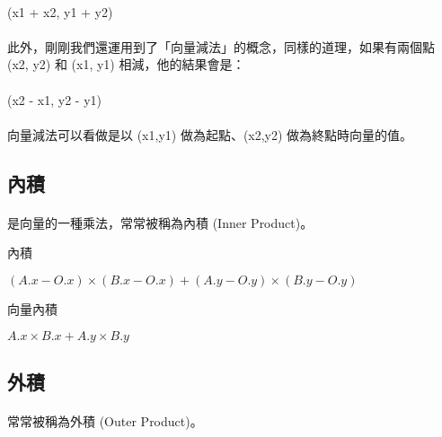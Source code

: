 \documentclass[12pt,a4paper,oneside]{report}
\begin{document}
\begin{CJK}{UTF8}{bkai}
\paragraph{}(x1 + x2, y1 + y2)
\paragraph{}此外，剛剛我們還運用到了「向量減法」的概念，同樣的道理，如果有兩個點 (x2, y2) 和 (x1, y1) 相減，他的結果會是：
\paragraph{}(x2 - x1, y2 - y1)
\paragraph{}向量減法可以看做是以 (x1,y1) 做為起點、(x2,y2) 做為終點時向量的值。

\subsection{內積}

\paragraph{}是向量的一種乘法，常常被稱為內積 (Inner Product)。
\begin{algorithm}
\caption{內積}
\label{algo:dot_product}
\begin{algorithmic}
  \State \Return $(A.x-O.x)\times{(B.x-O.x)}+(A.y-O.y)\times{(B.y-O.y)}$
\EndProcedure
\end{algorithmic}
\end{algorithm}

\begin{algorithm}
\caption{向量內積}
\label{algo:dot_product_vector}
\begin{algorithmic}
  \State \Return $A.x\times{B.x}+A.y\times{B.y}$
\EndProcedure
\end{algorithmic}
\end{algorithm}

\subsection{外積}
\paragraph{}常常被稱為外積 (Outer Product)。


\end{CJK}
\end{document}

